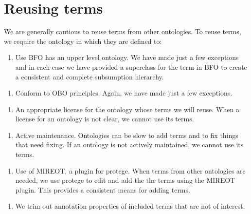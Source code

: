 \documentclass[letterpaper,10pt,english]{sphinxmanual}
\begin{document}
\section{Reusing terms}
\label{\detokenize{ontology-authors:reusing-terms}}
\sphinxAtStartPar
We are generally cautious to reuse terms from other ontologies.  To reuse terms, we
require the ontology in which they are defined to:
\begin{enumerate}
%
\item {} 
\sphinxAtStartPar
Use BFO has an upper level ontology.  We have made just a few exceptions and
in each case we have provided a superclass for the term in BFO to create a
consistent and complete subsumption hierarchy.

\end{enumerate}
\begin{enumerate}
%
\item {} 
\sphinxAtStartPar
Conform to OBO principles. Again, we have made just a few exceptions.

\end{enumerate}
\begin{enumerate}
%
\item {} 
\sphinxAtStartPar
An appropriate license for the ontology whose terms we will reuse.  When a license
for an ontology is not clear, we cannot use its terms.

\end{enumerate}
\begin{enumerate}
%
\item {} 
\sphinxAtStartPar
Active maintenance.  Ontologies can be slow to add terms and to fix things that
need fixing.  If an ontology is not actively maintained, we cannot use its terms.

\end{enumerate}
\begin{enumerate}
%
\item {} 
\sphinxAtStartPar
Use of MIREOT, a plug\sphinxhyphen{}in for protege.  When terms from other ontologies
are needed, we use protege to edit  and add the the terms using
the MIREOT plug\sphinxhyphen{}in.  This provides a consistent means for adding terms.

\end{enumerate}
\begin{enumerate}
%
\item {} 
\sphinxAtStartPar
We trim out annotation properties of included terms that are not of interest.

\end{enumerate}
\end{document}
